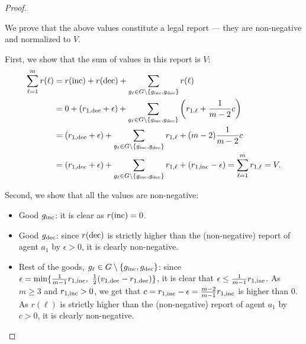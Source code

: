 \begin{proof}
\begin{itemize}
    \end{itemize}

We prove that the above values constitute a legal report --- they are  non-negative and normalized to $V$.

First, we show that the sum of values in this report is $V$:
    \begin{align*}
        \sum_{\ell =1}^m r(\ell) &= r(\mathrm{inc}) + r(\mathrm{dec}) +\sum_{g_{\ell} \in G \setminus \{g_{\mathrm{inc}}, g_{\mathrm{dec}}\}} r(\ell) 
        \\
        & = 0 + (r_{1,\mathrm{dec}} + \epsilon) + \sum_{g_{\ell} \in G \setminus \{g_{\mathrm{inc}}, g_{\mathrm{dec}}\}} \left(r_{1,\ell} + \frac{1}{m-2} c\right) 
        \\
        & = (r_{1,\mathrm{dec}} + \epsilon) + \sum_{g_{\ell} \in G \setminus \{g_{\mathrm{inc}}, g_{\mathrm{dec}}\}} r_{1,\ell} + (m-2)\frac{1}{m-2} c
        \\
        & = (r_{1,\mathrm{dec}} + \epsilon) + \sum_{g_{\ell} \in G \setminus \{g_{\mathrm{inc}}, g_{\mathrm{dec}}\}} r_{1,\ell} + (r_{1,\mathrm{inc}} - \epsilon) = \sum_{\ell =1}^m r_{1,\ell} = V.
    \end{align*}
    
Second, we show that all the values are non-negative:
    \begin{itemize}
        \item Good $g_{\mathrm{inc}}$: it is clear as $r(\mathrm{inc}) =0$.

        \item Good $g_{\mathrm{dec}}$: since  $r(\mathrm{dec})$ is strictly higher than the (non-negative) report of agent $a_1$ by $\epsilon >0 $, it is clearly non-negative.

        \item Rest of the goods, $g_{\ell} \in G \setminus \{g_{\mathrm{inc}}, g_{\mathrm{dec}}\}$: 
        since $\epsilon = \min \{\frac{1}{m-1}r_{1,\mathrm{inc}}, ~\frac{1}{2}(v_{1,\mathrm{dec}} - r_{1,\mathrm{dec}})\}$, it is clear that $\epsilon \leq \frac{1}{m-1}r_{1,\mathrm{inc}}$. As $m \geq 3$ and $r_{1,\mathrm{inc}} >0$, we get that $c = r_{1,\mathrm{inc}} - \epsilon = \frac{m-2}{m-1} r_{1,\mathrm{inc}}$ is higher than $0$.
        As $r(\ell)$ is strictly higher than the (non-negative) report of agent $a_1$ by $c >0 $, it is clearly non-negative.
    \end{itemize}



\end{proof}
